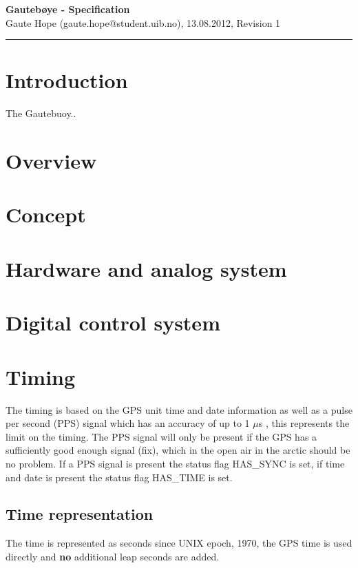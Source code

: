\documentclass[a4paper]{article}
\newcommand{\makeheading}[2]%
        {\hspace*{-\marginparsep minus \marginparwidth}%
         \begin{minipage}[t]{\textwidth\marginparwidth\marginparsep}%
           {\large \bfseries #1}\\{#2}\\[-0.15\baselineskip]%
                 \rule{\columnwidth}{1pt}%
         \end{minipage}}
\begin{document}
\makeheading{Gautebøye - Specification}{Gaute Hope
(gaute.hope@student.uib.no), 13.08.2012, Revision 1}

\vspace{2em}
\section*{Introduction}
The Gautebuoy..

\vspace{2em}

\begin{multicols}{2}
  \section{Overview}

  \section{Concept}

  \section{Hardware and analog system}

  \section{Digital control system}

  \section{Timing}
  The timing is based on the GPS unit time and date information as well
  as a pulse per second (PPS) signal which has an accuracy of up to 1
  $\mu$s \cite{em_406A_gps_ds}, this represents the limit on the timing. The PPS signal will
  only be present if the GPS has a sufficiently good enough signal (fix),
  which in the open air in the arctic should be no problem. If a PPS
  signal is present the status flag HAS\_SYNC is set, if time and date
  is present the status flag HAS\_TIME is set.

  \subsection{Time representation}
  The time is represented as seconds since UNIX epoch, 1970, the GPS
  time is used directly and \textbf{no} additional leap seconds are added.


\end{multicols}
\end{document}
